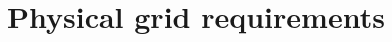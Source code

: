 %

%

%

\newpage

\section{Physical grid requirements}

\setcounter{section}{0}
\renewcommand{\thesection}{\shortname\arabic{section}}
\renewcommand{\thesubsection}{\shortname\arabic{section}.\arabic{subsection}}
\renewcommand{\thesubsubsection}{\shortname\arabic{section}.\arabic{subsection}.\arabic{subsubsection}}



%

 


%




















